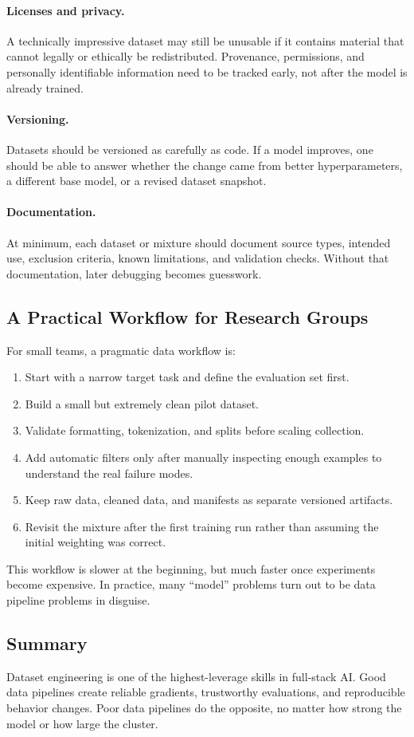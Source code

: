 \documentclass[class=article,crop=false]{standalone}
\begin{document}
\paragraph{Licenses and privacy.}
A technically impressive dataset may still be unusable if it contains material that cannot legally or ethically be redistributed. Provenance, permissions, and personally identifiable information need to be tracked early, not after the model is already trained.

\paragraph{Versioning.}
Datasets should be versioned as carefully as code. If a model improves, one should be able to answer whether the change came from better hyperparameters, a different base model, or a revised dataset snapshot.

\paragraph{Documentation.}
At minimum, each dataset or mixture should document source types, intended use, exclusion criteria, known limitations, and validation checks. Without that documentation, later debugging becomes guesswork.

\subsection{A Practical Workflow for Research Groups}
\label{sec:data:workflow}

For small teams, a pragmatic data workflow is:
\begin{enumerate}
  \item Start with a narrow target task and define the evaluation set first.
  \item Build a small but extremely clean pilot dataset.
  \item Validate formatting, tokenization, and splits before scaling collection.
  \item Add automatic filters only after manually inspecting enough examples to understand the real failure modes.
  \item Keep raw data, cleaned data, and manifests as separate versioned artifacts.
  \item Revisit the mixture after the first training run rather than assuming the initial weighting was correct.
\end{enumerate}

This workflow is slower at the beginning, but much faster once experiments become expensive. In practice, many ``model'' problems turn out to be data pipeline problems in disguise.

\subsection{Summary}
\label{sec:data:summary}

Dataset engineering is one of the highest-leverage skills in full-stack AI. Good data pipelines create reliable gradients, trustworthy evaluations, and reproducible behavior changes. Poor data pipelines do the opposite, no matter how strong the model or how large the cluster.
\end{document}
